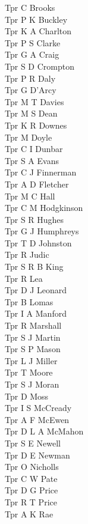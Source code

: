 \begin{multicols}{4}
  Tpr C Brooks \\
  Tpr P K Buckley \\
  Tpr K A Charlton \\
  Tpr P S Clarke \\
  Tpr G A Craig \\
  Tpr S D Crompton \\
  Tpr P R Daly \\
  Tpr G D'Arcy \\
  Tpr M T Davies \\
  Tpr M S Dean \\
  Tpr K R Downes \\
  Tpr M Doyle \\
  Tpr C I Dunbar \\
  Tpr S A Evans \\
  Tpr C J Finnerman \\
  Tpr A D Fletcher \\
  Tpr M C Hall \\
  Tpr C M Hodgkinson \\
  Tpr S R Hughes \\
  Tpr G J Humphreys \\
  Tpr T D Johnston \\
  Tpr R Judic \\
  Tpr S R B King \\
  Tpr R Lea \\
  Tpr D J Leonard \\
  Tpr B Lomas \\
  Tpr I A Manford \\
  Tpr R Marshall \\
  Tpr S J Martin \\
  Tpr S P Mason \\
  Tpr L J Miller \\
  Tpr T Moore \\
  Tpr S J Moran \\
  Tpr D Moss \\
  Tpr I S McCready \\
  Tpr A F McEwen \\
  Tpr D L A McMahon \\
  Tpr S E Newell \\
  Tpr D E Newman \\
  Tpr O Nicholls \\
  Tpr C W Pate \\
  Tpr D G Price \\
  Tpr R T Price \\
  Tpr A K Rae \\

\end{multicols}
